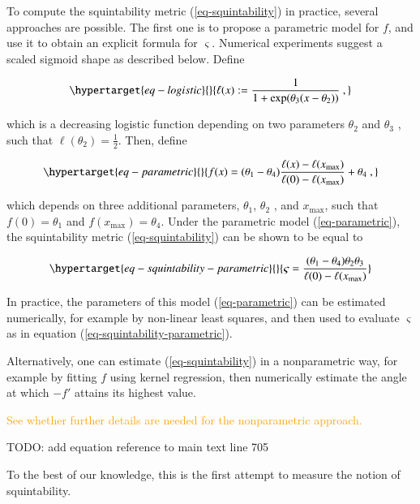 \documentclass[
  number,
  preprint,
  3p]{elsarticle}
\begin{document}
To compute the squintability metric (\ref{eq-squintability}) in
practice, several approaches are possible. The first one is to propose a
parametric model for \(f\), and use it to obtain an explicit formula for
\(\varsigma\). Numerical experiments suggest a scaled sigmoid shape as
described below. Define

\begin{equation}\protect\hypertarget{eq-logistic}{}{
\ell(x):=\frac{1}{1+\exp(\theta_{3}(x-\theta_{2}))}\ ,
}\label{eq-logistic}\end{equation}

which is a decreasing logistic function depending on two parameters
\(\theta_2\) and \(\theta_3\) , such that
\(\ell(\theta_{2})=\frac{1}{2}\). Then, define

\begin{equation}\protect\hypertarget{eq-parametric}{}{
f(x)=(\theta_{1}-\theta_{4})\frac{\ell(x)-\ell(x_{\max})}{\ell(0)-\ell(x_{\max})}+\theta_{4}\ ,
}\label{eq-parametric}\end{equation}

which depends on three additional parameters, \(\theta_1\), \(\theta_2\)
, and \(x_{\max}\), such that \(f(0)=\theta_1\) and
\(f(x_{\max})=\theta_4\). Under the parametric model
(\ref{eq-parametric}), the squintability metric (\ref{eq-squintability})
can be shown to be equal to

\begin{equation}\protect\hypertarget{eq-squintability-parametric}{}{
\varsigma=\frac{(\theta_{1}-\theta_{4})\theta_{2}\theta_{3}}{\ell(0)-\ell(x_{\max})}
}\label{eq-squintability-parametric}\end{equation}

In practice, the parameters of this model (\ref{eq-parametric}) can be
estimated numerically, for example by non-linear least squares, and then
used to evaluate \(\varsigma\) as in equation
(\ref{eq-squintability-parametric}).

Alternatively, one can estimate (\ref{eq-squintability}) in a
nonparametric way, for example by fitting \(f\) using kernel regression,
then numerically estimate the angle at which \(-f'\) attains its highest
value.

\textcolor{orange}{See whether further details are needed for the nonparametric approach.}

TODO: add equation reference to main text line 705

To the best of our knowledge, this is the first attempt to measure the
notion of squintability.
\end{document}
